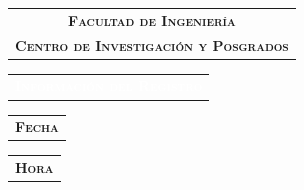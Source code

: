 \documentclass[12pt]{report}
\begin{document}
{\begin{minipage}{1.04\textwidth}
{\begin{minipage}{0.72\textwidth}
\begin{center}
\begin{tabular}{c}
\begin{minipage}[t]{0.95\columnwidth}
							\centering
							\textsc{\textbf{Facultad de Ingeniería}}                      
						\end{minipage}
						\vspace{0.1cm}\\
						\begin{minipage}[t]{0.95\columnwidth}%
							\centering
							\textsc{\textbf{Centro de Investigación y Posgrados}}                      
						\end{minipage}
					\end{tabular}
				\end{center}
		\end{minipage}}\hspace{0.1cm}%
	\end{minipage}
}

\bigskip
\begin{minipage}{\textwidth}
	\begin{tabular}{l}
		\begin{minipage}[t]{0.5\textwidth}%
			\cellcolor{blue!70}\textcolor{white}{\textsc{\textbf{Información del Registro}}}
		\end{minipage}
	\end{tabular}	
\end{minipage}

\begin{minipage}{\textwidth}
	\begin{tabular}{l}
		\begin{minipage}[t]{0.65\textwidth}%
			\cellcolor{blue!10}\textsc{\textbf{Fecha}}
		\end{minipage}
	\end{tabular}	
	\begin{tabular}{l}
		\begin{minipage}[t]{0.325\textwidth}%
			\centering
			\cellcolor{blue!10}\textsc{\textbf{Hora}}
		\end{minipage}
	\end{tabular}	
\end{minipage}
\end{document}

